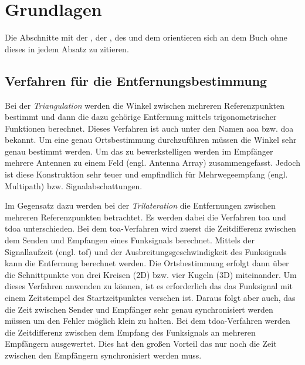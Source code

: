 %
%
%	
%
\chapter{Grundlagen}

Die Abschnitte mit der , der , des  und dem  orientieren sich an dem Buch  \cite{thrun2005probabilistic} ohne dieses in jedem Absatz zu zitieren.


%
%
\section{Verfahren für die Entfernungsbestimmung}

Bei der \textit{Triangulation} werden die Winkel zwischen mehreren Referenzpunkten bestimmt und dann die dazu gehörige Entfernung mittels trigonometrischer Funktionen berechnet. Dieses Verfahren ist auch unter den Namen \Gls{aoa} bzw. \Gls{doa} bekannt. Um eine genau Ortsbestimmung durchzuführen müssen die Winkel sehr genau bestimmt werden. Um das zu bewerkstelligen werden im Empfänger mehrere Antennen zu einem Feld (engl. Antenna Array) zusammengefasst. Jedoch ist diese Konstruktion sehr teuer und empfindlich für Mehrwegeempfang (engl. Multipath) bzw. Signalabschattungen. \cite{gezici2005localization, liu2007survey, decawave2014rtls}

Im Gegensatz dazu werden bei der \textit{Trilateration} die Entfernungen zwischen mehreren Referenzpunkten betrachtet. Es werden dabei die Verfahren \Gls{toa} und \Gls{tdoa} unterschieden.
Bei dem \Gls{toa}-Verfahren wird zuerst die Zeitdifferenz zwischen dem Senden und Empfangen eines Funksignals berechnet. Mittels der Signallaufzeit (engl. \gls{tof}) und der Ausbreitungsgeschwindigkeit des Funksignals kann die Entfernung berechnet werden. Die Ortsbestimmung erfolgt dann über die Schnittpunkte von drei Kreisen (2D) bzw. vier Kugeln (3D) miteinander. Um dieses Verfahren anwenden zu können, ist es erforderlich das das Funksignal mit einem Zeitstempel des Startzeitpunktes versehen ist. Daraus folgt aber auch, das die Zeit zwischen Sender und Empfänger sehr genau synchronisiert werden müssen um den Fehler möglich klein zu halten.
Bei dem \Gls{tdoa}-Verfahren werden die Zeitdifferenz zwischen dem Empfang des Funksignals an mehreren Empfängern ausgewertet. Dies hat den großen Vorteil das nur noch die Zeit zwischen den Empfängern synchronisiert werden muss. \cite{zekavat2011handbook, decawave2014rtls}

